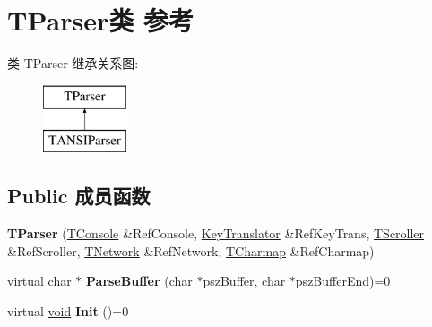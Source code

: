 \hypertarget{class_t_parser}{}\section{T\+Parser类 参考}
\label{class_t_parser}
类 T\+Parser 继承关系图\+:\begin{figure}[H]
\begin{center}
\leavevmode
\includegraphics[height=2.000000cm]{class_t_parser}
\end{center}
\end{figure}
\subsection*{Public 成员函数}
\begin{DoxyCompactItemize}
\item 
\mbox{\label{class_t_parser_a038c3a4531e7801c571b5e7fa30d98a1}} 
{\bfseries T\+Parser} (\hyperlink{class_t_console}{T\+Console} \&Ref\+Console, \hyperlink{class_key_translator}{Key\+Translator} \&Ref\+Key\+Trans, \hyperlink{class_t_scroller}{T\+Scroller} \&Ref\+Scroller, \hyperlink{class_t_network}{T\+Network} \&Ref\+Network, \hyperlink{class_t_charmap}{T\+Charmap} \&Ref\+Charmap)
\item 
\mbox{\label{class_t_parser_a8f8ad52a857049ecc72fd0dbdab43d26}} 
virtual char $\ast$ {\bfseries Parse\+Buffer} (char $\ast$psz\+Buffer, char $\ast$psz\+Buffer\+End)=0
\item 
\mbox{\label{class_t_parser_a02f0aef8164978153acc10b2e92ccf06}} 
virtual \hyperlink{interfacevoid}{void} {\bfseries Init} ()=0
\end{DoxyCompactItemize}
